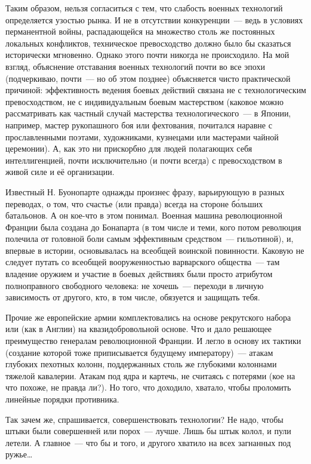 Таким образом, нельзя согласиться с тем, что слабость военных технологий определяется узостью рынка. И не в отсутствии конкуренции~--- ведь в условиях перманентной войны, распадающейся на множество столь же постоянных локальных конфликтов, техническое превосходство должно было бы сказаться исторически мгновенно. Однако этого почти никогда не происходило. На мой взгляд, объяснение отставания военных технологий почти во все эпохи (подчеркиваю, почти~--- но об этом позднее) объясняется чисто практической причиной: эффективность ведения боевых действий связана не с технологическим превосходством, не с индивидуальным боевым мастерством (каковое можно рассматривать как частный случай мастерства технологического~--- в Японии, например, мастер рукопашного боя или фехтования, почитался наравне с прославленными поэтами, художниками, кузнецами или мастерами чайной церемонии). А, как это ни прискорбно для людей полагающих себя интеллигенцией, почти исключительно (и почти всегда) с превосходством в живой силе и её организации. 

Известный Н. Буонопарте однажды произнес фразу, варьирующую в разных переводах, о том, что счастье (или правда) всегда на стороне 
б\'{о}льших батальонов. А он кое-что в этом понимал. Военная машина революционной Франции была создана до Бонапарта (в том числе и теми, кого потом революция полечила от головной боли самым эффективным средством~--- гильотиной), и, впервые в истории, основывалась на всеобщей воинской повинности. Каковую не следует путать со всеобщей вооруженностью варварского общества~--- там владение оружием и участие в боевых действиях были просто атрибутом полноправного свободного человека: не хочешь~--- переходи в личную зависимость от другого, кто, в том числе, обязуется и защищать тебя. 

Прочие же европейские армии комплектовались на основе рекрутского набора или (как в Англии) на квазидобровольной основе. Что и дало решающее преимущество генералам революционной Франции. И легло в основу их тактики (создание которой тоже приписывается будущему императору)~--- атакам глубоких пехотных колонн, поддержанных столь же глубокими колоннами тяжелой кавалерии. Атакам под ядра и картечь, не считаясь с потерями (кое на что похоже, не правда ли?). Но того, что доходило, хватало, чтобы проломить линейные порядки противника. 

Так зачем же, спрашивается, совершенствовать технологии? Не надо, чтобы штыки были совершенней или порох~--- лучше. Лишь бы штык колол, и пули летели. А главное~--- что бы и того, и другого хватило на всех загнанных под ружье\dots 

